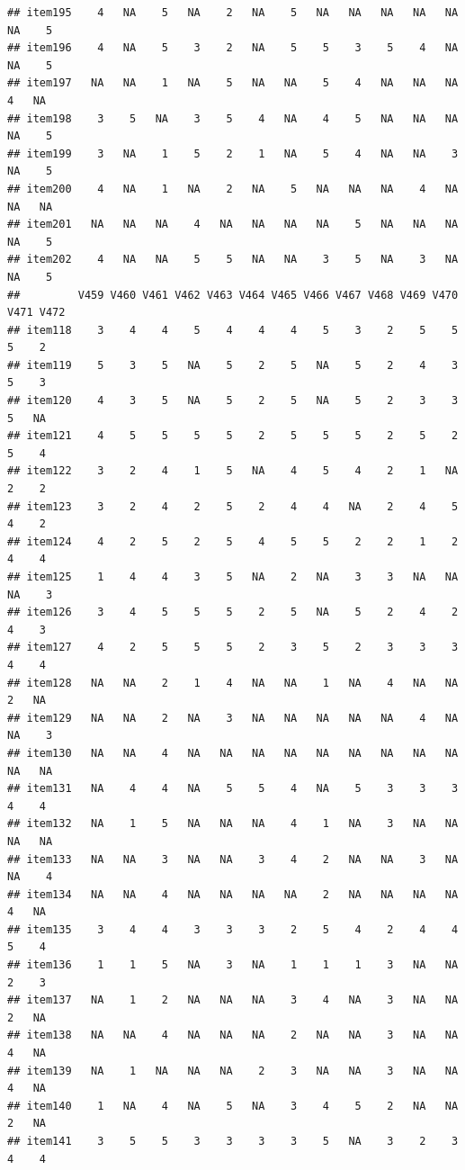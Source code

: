 \documentclass[
  man]{apa6}
\begin{document}
\begin{verbatim}
## item195    4   NA    5   NA    2   NA    5   NA   NA   NA   NA   NA   NA    5
## item196    4   NA    5    3    2   NA    5    5    3    5    4   NA   NA    5
## item197   NA   NA    1   NA    5   NA   NA    5    4   NA   NA   NA    4   NA
## item198    3    5   NA    3    5    4   NA    4    5   NA   NA   NA   NA    5
## item199    3   NA    1    5    2    1   NA    5    4   NA   NA    3   NA    5
## item200    4   NA    1   NA    2   NA    5   NA   NA   NA    4   NA   NA   NA
## item201   NA   NA   NA    4   NA   NA   NA   NA    5   NA   NA   NA   NA    5
## item202    4   NA   NA    5    5   NA   NA    3    5   NA    3   NA   NA    5
##         V459 V460 V461 V462 V463 V464 V465 V466 V467 V468 V469 V470 V471 V472
## item118    3    4    4    5    4    4    4    5    3    2    5    5    5    2
## item119    5    3    5   NA    5    2    5   NA    5    2    4    3    5    3
## item120    4    3    5   NA    5    2    5   NA    5    2    3    3    5   NA
## item121    4    5    5    5    5    2    5    5    5    2    5    2    5    4
## item122    3    2    4    1    5   NA    4    5    4    2    1   NA    2    2
## item123    3    2    4    2    5    2    4    4   NA    2    4    5    4    2
## item124    4    2    5    2    5    4    5    5    2    2    1    2    4    4
## item125    1    4    4    3    5   NA    2   NA    3    3   NA   NA   NA    3
## item126    3    4    5    5    5    2    5   NA    5    2    4    2    4    3
## item127    4    2    5    5    5    2    3    5    2    3    3    3    4    4
## item128   NA   NA    2    1    4   NA   NA    1   NA    4   NA   NA    2   NA
## item129   NA   NA    2   NA    3   NA   NA   NA   NA   NA    4   NA   NA    3
## item130   NA   NA    4   NA   NA   NA   NA   NA   NA   NA   NA   NA   NA   NA
## item131   NA    4    4   NA    5    5    4   NA    5    3    3    3    4    4
## item132   NA    1    5   NA   NA   NA    4    1   NA    3   NA   NA   NA   NA
## item133   NA   NA    3   NA   NA    3    4    2   NA   NA    3   NA   NA    4
## item134   NA   NA    4   NA   NA   NA   NA    2   NA   NA   NA   NA    4   NA
## item135    3    4    4    3    3    3    2    5    4    2    4    4    5    4
## item136    1    1    5   NA    3   NA    1    1    1    3   NA   NA    2    3
## item137   NA    1    2   NA   NA   NA    3    4   NA    3   NA   NA    2   NA
## item138   NA   NA    4   NA   NA   NA    2   NA   NA    3   NA   NA    4   NA
## item139   NA    1   NA   NA   NA    2    3   NA   NA    3   NA   NA    4   NA
## item140    1   NA    4   NA    5   NA    3    4    5    2   NA   NA    2   NA
## item141    3    5    5    3    3    3    3    5   NA    3    2    3    4    4

\end{verbatim}
\end{document}

